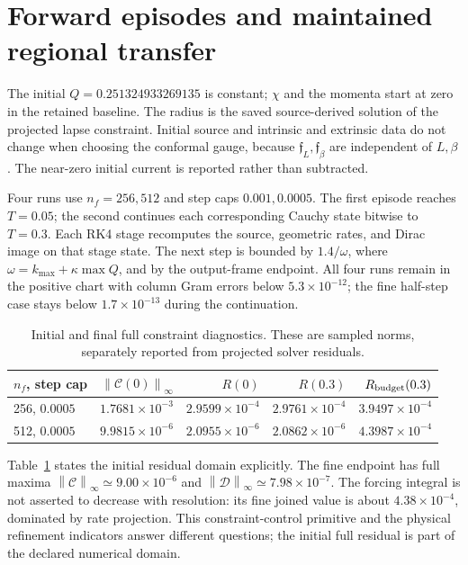 \documentclass[11pt]{article}
\newcommand{\norm}[1]{\left\lVert#1\right\rVert}
\begin{document}
\section{Forward episodes and maintained regional transfer}\label{sec:episodes}
The initial $Q=0.251324933269135$ is constant; $\chi$ and the momenta start
at zero in the retained baseline. The radius is the saved source-derived
solution of the projected lapse constraint. Initial source and intrinsic
and extrinsic data do not change when choosing the conformal gauge,
because $\mathfrak f_L,\mathfrak f_\beta$ are independent of $L,\beta$.
The near-zero initial current is reported rather than subtracted.

Four runs use $n_f=256,512$ and step caps $0.001,0.0005$.
The first episode reaches $T=0.05$; the second continues each corresponding
Cauchy state bitwise to $T=0.3$. Each RK4 stage recomputes the source,
geometric rates, and Dirac image on that stage state. The next step is
bounded by $1.4/\omega$, where
$\omega=k_{\max}+\kappa\max Q$, and by the output-frame endpoint.
All four runs remain in the positive chart with column Gram errors below
$5.3\times10^{-12}$; the fine half-step case stays below
$1.7\times10^{-13}$ during the continuation.

\begin{table}[tbp]
\centering
\caption{Initial and final full constraint diagnostics. These are sampled
norms, separately reported from projected solver residuals.}
\label{tab:constraints}
\begin{tabular}{lrrrr}
\toprule
$n_f$, step cap & $\norm{\mathcal C(0)}_\infty$ & $R(0)$ & $R(0.3)$ & $R_{\rm budget}(0.3)$\\
\midrule
256, $0.0005$ & $1.7681\!\times\!10^{-3}$ & $2.9599\!\times\!10^{-4}$ & $2.9761\!\times\!10^{-4}$ & $3.9497\!\times\!10^{-4}$\\
512, $0.0005$ & $9.9815\!\times\!10^{-6}$ & $2.0955\!\times\!10^{-6}$ & $2.0862\!\times\!10^{-6}$ & $4.3987\!\times\!10^{-4}$\\
\bottomrule
\end{tabular}
\end{table}
Table~\ref{tab:constraints} states the initial residual domain explicitly.
The fine endpoint has full maxima $\norm{\mathcal C}_\infty\simeq
9.00\times10^{-6}$ and $\norm{\mathcal D}_\infty\simeq7.98\times10^{-7}$.
The forcing integral is not asserted to decrease with resolution: its fine
joined value is about $4.38\times10^{-4}$, dominated by rate projection.
This constraint-control primitive and the physical refinement indicators
answer different questions; the initial full residual is part of the
declared numerical domain.
\end{document}
